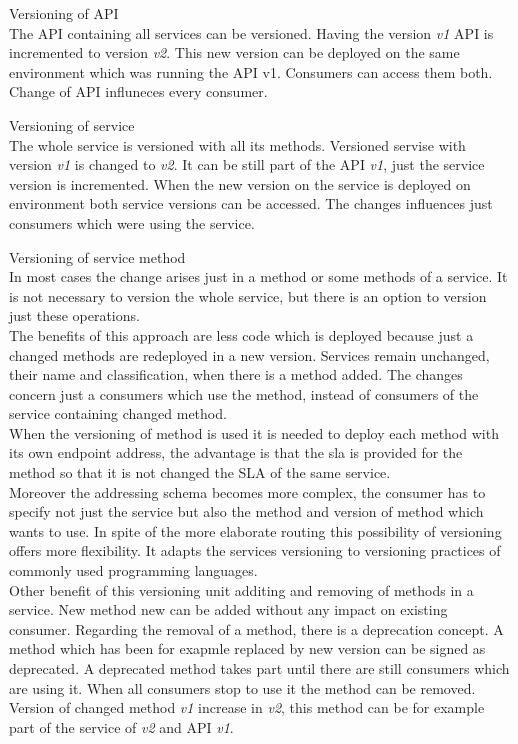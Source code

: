 \begin{description}
\item{Versioning of API} \\
The API containing all services can be versioned. Having the version \emph{v1} API is incremented to version \emph{v2}. This new version can be deployed on the same environment which was running the API v1. Consumers can access them both. Change of API influneces every consumer.
\item{Versioning of service} \\
  The whole service is versioned with all its methods. Versioned servise with version \emph{v1} is changed to \emph{v2}. It can be still part of the API \emph{v1}, just the service version is incremented. When the new version on the service is deployed on environment both service versions can be accessed. The changes influences just consumers which were using the service.
\item{Versioning of service method} \\
  In most cases the change arises just in a method or some methods of a service. It is not necessary to version the whole service, but there is an option to version just these operations. \\
  The benefits of this approach are less code which is deployed because just a changed methods are redeployed in a new version. Services remain unchanged, their name and classification, when there is a method added. The changes concern just a consumers which use the method, instead of consumers of the service containing changed method. \\
  When the versioning of method is used it is needed to deploy each method with its own endpoint address, the advantage is that the \gls{sla} is provided for the method so that it is not changed the SLA of the same service.\\
  Moreover the addressing schema becomes more complex, the consumer has to specify not just the service but also the method and version of method which wants to use.
  In spite of the more elaborate routing this possibility of versioning offers more flexibility. It adapts the services versioning to versioning practices of commonly used programming languages. \\
Other benefit of this versioning unit additing and removing of methods in a service. New method new can be added without any impact on existing consumer. Regarding the removal of a method, there is a deprecation concept. A method which has been for exapmle replaced by new version can be signed as deprecated. A deprecated method takes part until there are still consumers which are using it. When all consumers stop to use it the method can be removed.\\
  Version of changed method \emph{v1} increase in \emph{v2}, this method can be for example part of the service of \emph{v2} and API \emph{v1}.
\end{description}


